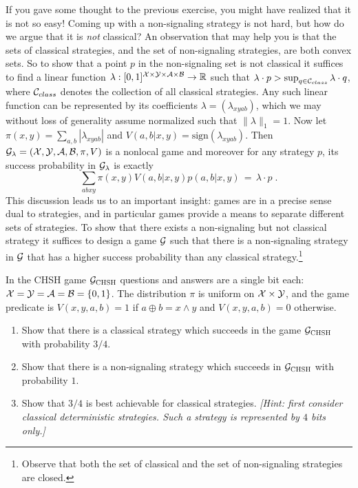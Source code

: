 If you gave some thought to the previous exercise, you might have realized that it is not so easy! Coming up with a non-signaling strategy is not hard, but how do we argue that it is \emph{not} classical? An observation that may help you is that the sets of classical strategies, and the set of non-signaling strategies, are both convex sets. So to show that a point $p$ in the non-signaling set is not classical it suffices to find a linear function $\lambda:[0,1]^{\mathcal{X}\times\mathcal{Y}\times \mathcal{A}\times \mathcal{B}} \to \mathbb{R}$ such that $\lambda\cdot p > \sup_{q\in \mathcal{C}_{class}} \lambda\cdot q$, where $\mathcal{C}_{class}$ denotes the collection of all classical strategies. 
Any such linear function can be represented by its coefficients $\lambda = (\lambda_{xyab})$, which we may without loss of generality assume normalized such that $\|\lambda\|_1=1$. Now let $\pi(x,y)=\sum_{a,b}|\lambda_{xyab}|$ and $V(a,b|x,y)=\text{sign}(\lambda_{xyab})$. Then $\mathcal{G}_\lambda=(\mathcal{X},\mathcal{Y},\mathcal{A},\mathcal{B},\pi,V)$ is a nonlocal game and moreover for any strategy $p$, its success probability in $\mathcal{G}_\lambda$ is exactly
\[\sum_{abxy} \pi(x,y)V(a,b|x,y)p(a,b|x,y) \,=\, \lambda \cdot p\;.\]
This discussion leads us to an important insight: games are in a precise sense dual to strategies, and in particular games provide a means to separate different sets of strategies. To show that there exists a non-signaling but not classical strategy it suffices to design a game $\mathcal{G}$ such that there is a non-signaling strategy in $\mathcal{G}$ that has a higher success probability than any classical strategy.\footnote{Observe that both the set of classical and the set of non-signaling strategies are closed.}  

\begin{example}\label{ex:chsh}
In the CHSH game $\mathcal{G}_{\textsc{CHSH}}$ questions and answers are a single bit each: $\mathcal{X}=\mathcal{Y}=\mathcal{A}=\mathcal{B}=\{0,1\}$. The distribution $\pi$ is uniform on $\mathcal{X}\times \mathcal{Y}$, and the game predicate is $V(x,y,a,b)=1$ if $a\oplus b = x\wedge y$ and $V(x,y,a,b)=0$ otherwise. 
\end{example}

\begin{exercise}\label{ex:chsh-bias}
\begin{enumerate}
\item Show that there is a classical strategy which succeeds in the game $\mathcal{G}_{\textsc{CHSH}}$ with probability $3/4$.
\item Show that there is a non-signaling strategy which succeeds in $\mathcal{G}_{\textsc{CHSH}}$ with probability $1$.  
\item Show that $3/4$ is best achievable for classical strategies. \emph{[Hint: first consider classical deterministic strategies. Such a strategy is represented by $4$ bits only.]}
\end{enumerate}
\end{exercise}


